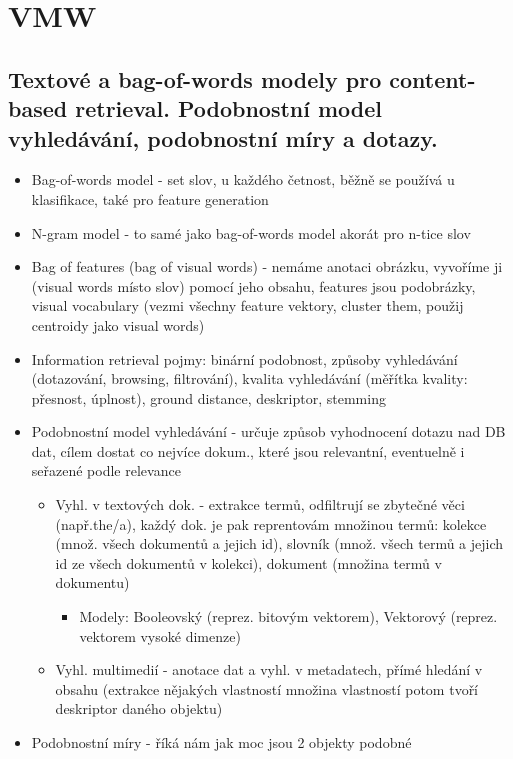 \documentclass[a4paper,hidelinks]{article}
\begin{document}
\section{VMW}

\subsection{Textové a bag-of-words modely pro content-based retrieval. Podobnostní model vyhledávání, podobnostní míry a dotazy.}

\begin{itemize}
    \item Bag-of-words model - set slov, u každého četnost, běžně se používá u klasifikace, také pro feature generation
    \item N-gram model - to samé jako bag-of-words model akorát pro n-tice slov
    \item Bag of features (bag of visual words) - nemáme anotaci obrázku, vyvoříme ji (visual words místo slov) pomocí jeho obsahu, features jsou podobrázky, visual vocabulary (vezmi všechny feature vektory, cluster them, použij centroidy jako visual words)
    \item Information retrieval pojmy: binární podobnost, způsoby vyhledávání (dotazování, browsing, filtrování), kvalita vyhledávání (měřítka kvality: přesnost, úplnost), ground distance, deskriptor, stemming
    \item Podobnostní model vyhledávání - určuje způsob vyhodnocení dotazu nad DB dat, cílem dostat co nejvíce dokum., které jsou relevantní, eventuelně i seřazené podle relevance
    \begin{itemize}
        \item Vyhl. v textových dok. - extrakce termů, odfiltrují se zbytečné věci (např.the/a), každý dok. je pak reprentovám množinou termů: kolekce (množ. všech dokumentů a jejich id), slovník (množ. všech termů a jejich id ze všech dokumentů v kolekci), dokument (množina termů v dokumentu)
        \begin{itemize}
            \item Modely: Booleovský (reprez. bitovým vektorem), Vektorový (reprez. vektorem vysoké dimenze)
        \end{itemize}
        \item Vyhl. multimedií - anotace dat a vyhl. v metadatech, přímé hledání v obsahu (extrakce nějakých vlastností množina vlastností potom tvoří deskriptor daného objektu)
    \end{itemize}
    \item Podobnostní míry - říká nám jak moc jsou 2 objekty podobné

\end{itemize}
\end{document}
